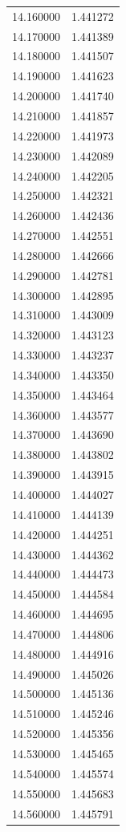 \begin{tabular}{rr}
14.160000 & 1.441272 \\
14.170000 & 1.441389 \\
14.180000 & 1.441507 \\
14.190000 & 1.441623 \\
14.200000 & 1.441740 \\
14.210000 & 1.441857 \\
14.220000 & 1.441973 \\
14.230000 & 1.442089 \\
14.240000 & 1.442205 \\
14.250000 & 1.442321 \\
14.260000 & 1.442436 \\
14.270000 & 1.442551 \\
14.280000 & 1.442666 \\
14.290000 & 1.442781 \\
14.300000 & 1.442895 \\
14.310000 & 1.443009 \\
14.320000 & 1.443123 \\
14.330000 & 1.443237 \\
14.340000 & 1.443350 \\
14.350000 & 1.443464 \\
14.360000 & 1.443577 \\
14.370000 & 1.443690 \\
14.380000 & 1.443802 \\
14.390000 & 1.443915 \\
14.400000 & 1.444027 \\
14.410000 & 1.444139 \\
14.420000 & 1.444251 \\
14.430000 & 1.444362 \\
14.440000 & 1.444473 \\
14.450000 & 1.444584 \\
14.460000 & 1.444695 \\
14.470000 & 1.444806 \\
14.480000 & 1.444916 \\
14.490000 & 1.445026 \\
14.500000 & 1.445136 \\
14.510000 & 1.445246 \\
14.520000 & 1.445356 \\
14.530000 & 1.445465 \\
14.540000 & 1.445574 \\
14.550000 & 1.445683 \\
14.560000 & 1.445791 \\

\end{tabular}
